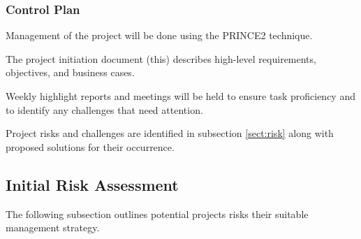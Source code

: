 \subsubsection*{Control Plan}
Management of the project will be done using the PRINCE2 technique. 

The project initiation document (this) describes high-level requirements, objectives, and business cases.

Weekly highlight reports and meetings will be held to ensure task proficiency and to identify any challenges that need attention.

Project risks and challenges are identified in subsection \ref{sect:risk} along with proposed solutions for their occurrence.

\newpage
\subsection*{Initial Risk Assessment}\label{sect:risk}
The following subsection outlines potential projects risks their suitable management strategy.

